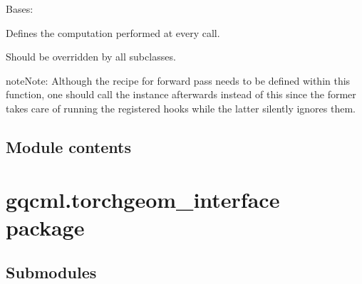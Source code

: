 \documentclass[letterpaper,10pt,english]{sphinxmanual}
\begin{document}
\begin{fulllineitems}
\label{\detokenize{modules/gqcml.nn:gqcml.nn.models_test.GCNConv_tg}}
Bases: 

\begin{fulllineitems}
\label{\detokenize{modules/gqcml.nn:gqcml.nn.models_test.GCNConv_tg.forward}}
Defines the computation performed at every call.

Should be overridden by all subclasses.

\begin{sphinxadmonition}{note}{Note:}
Although the recipe for forward pass needs to be defined within
this function, one should call the  instance afterwards
instead of this since the former takes care of running the
registered hooks while the latter silently ignores them.
\end{sphinxadmonition}

\end{fulllineitems}


\end{fulllineitems}



\section{Module contents}
\label{\detokenize{modules/gqcml.nn:module-gqcml.nn}}\label{\detokenize{modules/gqcml.nn:module-contents}}

\chapter{gqcml.torchgeom\_interface package}
\label{\detokenize{modules/gqcml.torchgeom_interface:gqcml-torchgeom-interface-package}}\label{\detokenize{modules/gqcml.torchgeom_interface::doc}}

\section{Submodules}
\label{\detokenize{modules/gqcml.torchgeom_interface:submodules}}
\end{document}
